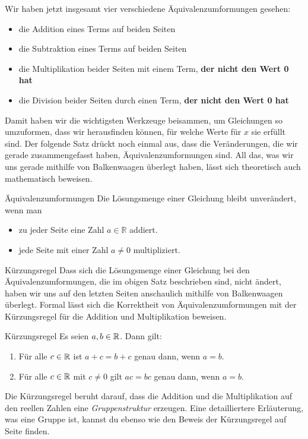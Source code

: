 \documentclass[../../main.tex]{subfiles}
\begin{document}
Wir haben jetzt insgesamt vier verschiedene Äquivalenzumformungen gesehen:
\begin{itemize}
    \item die Addition eines Terms auf beiden Seiten
    \item die Subtraktion eines Terms auf beiden Seiten
    \item die Multiplikation beider Seiten mit einem Term, \textbf{der nicht den Wert 0 hat}
    \item die Division beider Seiten durch einen Term, \textbf{der nicht den Wert 0 hat}
\end{itemize}

Damit haben wir die wichtigsten Werkzeuge beisammen, um Gleichungen so umzuformen, dass wir herausfinden können, für welche Werte für $x$ sie erfüllt sind. Der folgende Satz drückt noch einmal aus, dass die Veränderungen, die wir gerade zusammengefasst haben, Äquivalenzumformungen sind. All das, was wir uns gerade mithilfe von Balkenwaagen überlegt haben, lässt sich theoretisch auch mathematisch beweisen.

\begin{theorem}{Äquivalenzumformungen}
    Die Lösungsmenge einer Gleichung bleibt unverändert, wenn man
    \begin{itemize}
        \item zu jeder Seite eine Zahl $a\in\mathbb{R}$ addiert.
        \item jede Seite mit einer Zahl $a\neq 0$ multipliziert.
    \end{itemize}
\end{theorem}
\begin{advanced}{Kürzungsregel}
    Dass sich die Lösungsmenge einer Gleichung bei den Äquivalenzumformungen, die im obigen Satz beschrieben sind, nicht ändert, haben wir uns auf den letzten Seiten anschaulich mithilfe von Balkenwaagen überlegt. Formal lässt sich die Korrektheit von Äquivalenzumformungen mit der Kürzungsregel für die Addition und Multiplikation beweisen.
    
    \begin{theorem}{Kürzungsregel}
        Es seien $a,b\in\mathbb{R}$. Dann gilt: 
        \begin{enumerate}
            \item Für alle $c\in\mathbb{R}$ ist $a+c=b+c$ genau dann, wenn $a=b$.
            \item Für alle $c\in\mathbb{R}$ mit $c\neq 0$ gilt $ac=bc$ genau dann, wenn $a=b$.
        \end{enumerate}
    \end{theorem}
    
    Die Kürzungsregel beruht darauf, dass die Addition und die Multiplikation auf den reellen Zahlen eine \emph{Gruppenstruktur} erzeugen. Eine detailliertere Erläuterung, was eine Gruppe ist, kannst du ebenso wie den Beweis der Kürzungsregel auf Seite \pageref{} finden. 
\end{advanced}
\end{document}
